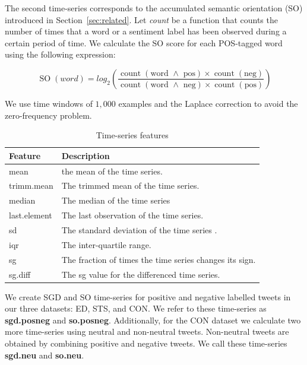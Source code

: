 \documentclass{sig-alternate}
\begin{document}
The second time-series corresponds to the accumulated semantic orientation (SO) introduced in Section~\ref{sec:related}. Let \emph{count} be a function that counts the number of times that a word or a sentiment label has been observed during a certain period of time. We calculate the SO score for each POS-tagged word using the following expression:   

\begin{equation}
 \operatorname{SO}(word) = log_2 \left( \frac{\operatorname{count}(\text{word $\wedge$ pos}) \times \operatorname{count}(\text{neg})}{\operatorname{count}(\text{word $\wedge$ neg}) \times \operatorname{count}(\text{pos})}\right)
\end{equation}


We use time windows of $1,000$ examples and the Laplace correction to avoid the zero-frequency problem. 


\begin{table}[htbp]
\footnotesize
\begin{center}
\begin{tabular}{l|l}
\hline
Feature & Description \\ \hline
mean &  the mean of the time series. \\ 
trimm.mean &  The trimmed mean of the time series. \\ 
median &  The median of the time series \\ 
last.element &  The last observation of the time series.\\ 
sd &  The standard deviation of the time series . \\ 
iqr &  The inter-quartile range. \\ 
sg &  The fraction of times the time series changes its sign. \\ 
sg.diff &  The sg value for the  differenced time series. \\ \hline
\end{tabular}
\end{center}
\caption{Time-series features}
\label{tab:feat}
\end{table}

We create SGD and SO time-series for positive and negative labelled tweets in our three datasets: ED, STS, and CON. We refer to these time-series as \textbf{sgd.posneg} and \textbf{so.posneg}. Additionally, for the CON dataset we calculate two more time-series using neutral and non-neutral tweets. Non-neutral tweets are obtained by combining positive and negative tweets.  We call these time-series \textbf{sgd.neu} and \textbf{so.neu}. 
\end{document}
